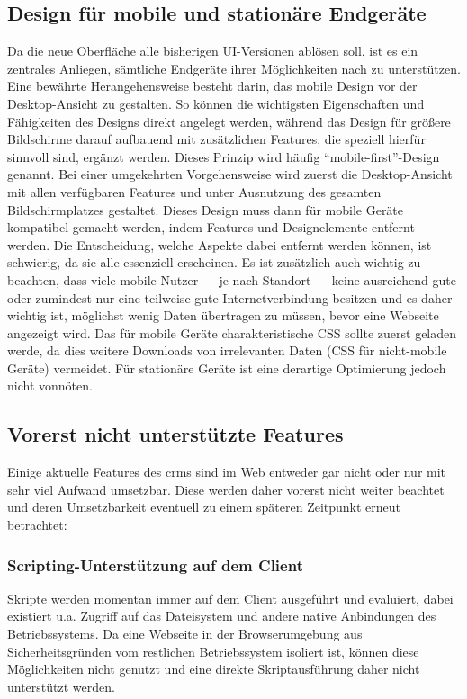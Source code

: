 \subsection{Design für mobile und stationäre Endgeräte}
Da die neue Oberfläche alle bisherigen UI-Versionen ablösen soll, ist es ein zentrales Anliegen, sämtliche Endgeräte ihrer Möglichkeiten nach zu unterstützen. Eine bewährte Herangehensweise besteht darin, das mobile Design vor der Desktop-Ansicht zu gestalten. So können die wichtigsten Eigenschaften und Fähigkeiten des Designs direkt angelegt werden, während das Design für größere Bildschirme darauf aufbauend mit zusätzlichen Features, die speziell hierfür sinnvoll sind, ergänzt werden. Dieses Prinzip wird häufig ``mobile-first''-Design genannt. Bei einer umgekehrten Vorgehensweise wird zuerst die Desktop-Ansicht mit allen verfügbaren Features und unter Ausnutzung des gesamten Bildschirmplatzes gestaltet. Dieses Design muss dann für mobile Geräte kompatibel gemacht werden, indem Features und Designelemente entfernt werden. Die Entscheidung, welche Aspekte dabei entfernt werden können, ist schwierig, da sie alle essenziell erscheinen.
Es ist zusätzlich auch wichtig zu beachten, dass viele mobile Nutzer --- je nach Standort --- keine ausreichend gute oder zumindest nur eine teilweise gute Internetverbindung besitzen und es daher wichtig ist, möglichst wenig Daten übertragen zu müssen, bevor eine Webseite angezeigt wird. Das für mobile Geräte charakteristische CSS sollte zuerst geladen werde, da dies weitere Downloads von irrelevanten Daten (CSS für nicht-mobile Geräte) vermeidet. Für stationäre Geräte ist eine derartige Optimierung jedoch nicht vonnöten.

\subsection{Vorerst nicht unterstützte Features}
Einige aktuelle Features des \gls{crm}s sind im Web entweder gar nicht oder nur mit sehr viel Aufwand umsetzbar. Diese werden daher vorerst nicht weiter beachtet und deren Umsetzbarkeit eventuell zu einem späteren Zeitpunkt erneut betrachtet:

\subsubsection{Scripting-Unterstützung auf dem Client}
Skripte werden momentan immer auf dem Client ausgeführt und evaluiert, dabei existiert u.a. Zugriff auf das Dateisystem und andere native Anbindungen des Betriebssystems. Da eine Webseite in der Browserumgebung aus Sicherheitsgründen vom restlichen Betriebssystem isoliert ist, können diese Möglichkeiten nicht genutzt und eine direkte Skriptausführung daher nicht unterstützt werden. 

